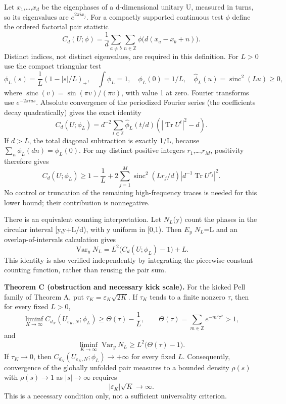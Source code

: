 Let \(x_{1}\),\ldots,\(x_{d}\) be the eigenphases of a d-dimensional unitary U, measured in turns, so its eigenvalues are \(e^{2\pi ix_j}\). For a compactly supported continuous test \(\phi\) define the ordered factorial pair statistic \[
 C_d(U;\phi)=\frac1d\sum_{a\ne b}\sum_{n\in\mathbb Z}
              \phi\bigl(d(x_a-x_b+n)\bigr).                    \tag{FN.23}
\] Distinct indices, not distinct eigenvalues, are required in this definition. For \(L>0\) use the compact triangular test \[
 \phi_L(s)=\frac1L(1-|s|/L)_+,\quad
 \int\phi_L=1,\quad \phi_L(0)=1/L,\quad
 \widehat\phi_L(u)=\operatorname{sinc}^2(Lu)\geq0,               \tag{FN.24}
\] where \(\operatorname{sinc}(v)=\sin(\pi v)/(\pi v)\), with value 1 at zero. Fourier transforms use \(e^{-2\pi ius}\). Absolute convergence of the periodized Fourier series (the coefficients decay quadratically) gives the exact identity \[
 C_d(U;\phi_L)=d^{-2}\sum_{t\in\mathbb Z}
   \widehat\phi_L(t/d)(|\operatorname{Tr}U^t|^2-d).              \tag{FN.25}
\] If \(d>L\), the total diagonal subtraction is exactly 1/L, because \(\sum_n\phi_L(dn)=\phi_L(0)\). For any distinct positive integers \(r_{1}\),\ldots,\(r_{M}\), positivity therefore gives \[
 C_d(U;\phi_L)\geq1-\frac1L+
   2\sum_{j=1}^M\operatorname{sinc}^2(Lr_j/d)
                   |d^{-1}\operatorname{Tr}U^{r_j}|^2.         \tag{FN.26}
\] No control or truncation of the remaining high-frequency traces is needed for this lower bound; their contribution is nonnegative.

There is an equivalent counting interpretation. Let \(N_{L}\)(y) count the phases in the circular interval {[}y,y+L/d), with y uniform in {[}0,1). Then \(E_{y}\) \(N_{L}\)=L and an overlap-of-intervals calculation gives \[
 \operatorname{Var}_y N_L
      =L^2\bigl(C_d(U;\phi_L)-1\bigr)+L.                       \tag{FN.27}
\] This identity is also verified independently by integrating the piecewise-constant counting function, rather than reusing the pair sum.

\textbf{Theorem C (obstruction and necessary kick scale).} For the kicked Pell family of Theorem A, put \(\tau_K=\varepsilon_K\sqrt{2K}\). If \(\tau_{K}\) tends to a finite nonzero \(\tau\), then for every fixed \(L>0\), \[
 \liminf_{K\to\infty} C_{d_N}(U_{\varepsilon_K,N};\phi_L)
      \geq \Theta(\tau)-\frac1L,\qquad
 \Theta(\tau)=\sum_{m\in\mathbb Z}e^{-m^2\tau^2}>1,             \tag{FN.28}
\] and \[
 \liminf_{K\to\infty}\operatorname{Var}_y N_L
      \geq L^2\bigl(\Theta(\tau)-1\bigr).                      \tag{FN.29}
\] If \(\tau_K\to0\), then \(C_{d_N}(U_{\varepsilon_K,N};\phi_L)\to+\infty\) for every fixed \(L\). Consequently, convergence of the globally unfolded pair measures to a bounded density \(\rho(s)\) with \(\rho(s)\to1\) as \(|s|\to\infty\) requires \[
             |\varepsilon_K|\sqrt K\longrightarrow\infty.     \tag{FN.30}
\] This is a necessary condition only, not a sufficient universality criterion.

